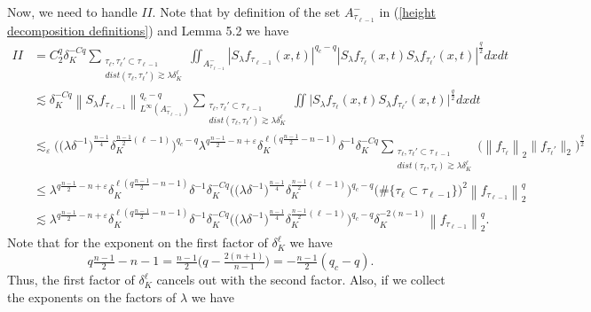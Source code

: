 \documentclass[11pt]{amsart}
\numberwithin{equation}{section}
\newcommand{\la}{\lambda}
\newcommand\norm[1]{\left\lVert#1\right\rVert}
\newcommand{\lpnorm}[3]{\norm{#1}_{L^{#2}(#3)}}
\newcommand{\altlpnorm}[2]{\norm{#1}_{#2}}
\newcommand{\Sl}{S_{\la}}
\newcommand{\dK}[1]{\delta_{K}^{#1}}
\begin{document}
Now, we need to handle $II$. Note that by definition of the set $A_{\tau_{\ell - 1}}^{-}$ in (\ref{height decomposition definitions}) and Lemma 5.2 we have
\begin{equation} \label{broad term estimate}
\begin{split}
    II &= C_2^{q}\dK{-Cq}\sum_{\substack{\tau_{\ell},\tau_{\ell}' \subset \tau_{\ell - 1} \\ dist(\tau_{\ell}, \tau_{\ell}') \gtrsim \la \dK{\ell}}} \iint_{A_{\tau_{\ell - 1}}^{-}}|\Sl f_{\tau_{\ell - 1}}(x,t)|^{q_c - q}  |\Sl f_{\tau_{\ell}}(x,t)\Sl f_{\tau_{\ell}'}(x,t)|^{\frac{q}{2}}dxdt \\
    &\lesssim \dK{-Cq} \lpnorm{\Sl f_{\tau_{\ell - 1}}}{\infty}{A_{\tau_{\ell - 1}}^{-}}^{q_c - q}\sum_{\substack{\tau_{\ell},\tau_{\ell}' \subset \tau_{\ell - 1} \\ dist(\tau_{\ell}, \tau_{\ell}') \gtrsim \la \dK{\ell}}} \iint \big| \Sl f_{\tau_{\ell}}(x,t)\Sl f_{\tau_{\ell}'}(x,t)\big|^{\frac{q}{2}}dxdt \\
    &\lesssim_{\varepsilon}  \Big(\big(\la \delta^{-1}\big)^{\frac{n-1}{4}}\dK{\frac{n-1}{2}(\ell - 1)}\Big)^{q_c - q} \la^{q\frac{n-1}{2} - n + \varepsilon} \dK{\ell(q\frac{n-1}{2} - n -1)} \delta^{-1} \dK{-Cq}\sum_{\substack{\tau_{\ell},\tau_{\ell}' \subset \tau_{\ell - 1} \\ dist(\tau_{\ell}, \tau_{\ell}) \gtrsim \la \dK{\ell}}} \Big( \altlpnorm{f_{\tau_{\ell}}}{2} \lVert f_{\tau_{\ell}'} \rVert_{2}\Big)^{\frac{q}{2}} \\
    & \leq \la^{q\frac{n-1}{2} - n + \varepsilon} \dK{\ell(q\frac{n-1}{2} - n -1)} \delta^{-1} \dK{-Cq} \Big(\big(\la \delta^{-1}\big)^{\frac{n-1}{4}}\dK{\frac{n-1}{2}(\ell - 1)}\Big)^{q_c - q} \big( \#\{\tau_{\ell} \subset \tau_{\ell - 1}\} \big)^2 \altlpnorm{f_{\tau_{\ell - 1}}}{2}^q \\
    & \lesssim \la^{q\frac{n-1}{2} - n + \varepsilon} \dK{\ell(q\frac{n-1}{2} - n -1)} \delta^{-1} \dK{-Cq} \Big(\big(\la \delta^{-1}\big)^{\frac{n-1}{4}}\dK{\frac{n-1}{2}(\ell - 1)}\Big)^{q_c - q} \dK{-2(n-1)} \altlpnorm{f_{\tau_{\ell - 1}}}{2}^q.
\end{split}
\end{equation}
Note that for the exponent on the first factor of $\dK{\ell}$ we have
\begin{equation}
    q\tfrac{n-1}{2} - n - 1= \tfrac{n-1}{2}\big(q - \tfrac{2(n+1)}{n-1}\big) = -\tfrac{n-1}{2}(q_c - q).
\end{equation}
Thus, the first factor of $\dK{\ell}$ cancels out with the second factor. Also, if we collect the exponents on the factors of $\la$ we have
\end{document}
